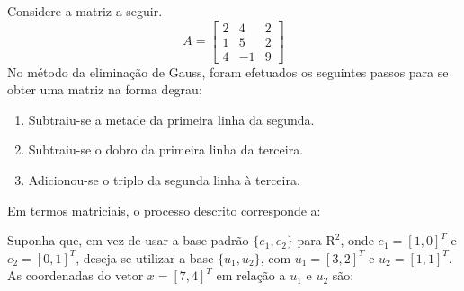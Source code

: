 \documentclass[10pt,a4paper]{article}
\begin{document}
%
{
\def\AMCbeginQuestion#1#2{\par\noindent{\bf (POSCOMP 2011 - Questão 01)}}
\begin{question}{} Considere a matriz a seguir.
\[
A=\left[\begin{array}{rrr}2&4&2\\1&5&2\\4&-1&9\end{array}\right]
\]
No método da eliminação de Gauss, foram efetuados os seguintes passos para se obter uma matriz na forma degrau:
\begin{enumerate}
\item[I.] Subtraiu-se a metade da primeira linha da segunda.
\item[II.] Subtraiu-se o dobro da primeira linha da terceira.
\item[III.] Adicionou-se o triplo da segunda linha à terceira.
\end{enumerate}
Em termos matriciais, o processo descrito corresponde a:
\begin{choices}
\end{choices}
\end{question}
}
%
{
\def\AMCbeginQuestion#1#2{\par\noindent{\bf (POSCOMP 2011 - Questão 03)}}
\begin{question}{} Suponha que, em vez de usar a base padrão $\{e_1,e_2\}$ para $\mathrm{R}^{2}$, onde $e_1=[1,0]^{T}$ e $e_2=[0,1]^{T}$, deseja-se utilizar a base $\{u_1,u_2\}$, com $u_1=[3,2]^{T}$ e $u_2=[1,1]^{T}$. As coordenadas do vetor $x=[7,4]^{T}$ em relação a $u_1$ e $u_2$ são:
\begin{choices}
\end{choices}
\end{question}
}
\end{document}

